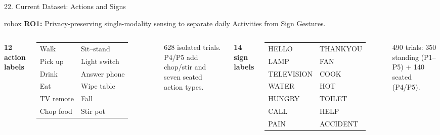 \documentclass[aspectratio=169,11pt,xcolor=table]{beamer}
\newcommand{\ROoneSent}{Privacy-preserving single-modality sensing to separate daily Activities from Sign Gestures.}
\newcommand{\robox}[1]{%
    \vspace{-0.12cm}%
    \begin{beamercolorbox}[
        wd=0.965\textwidth,
        sep=4pt,
        rounded=true
    ]{robox}
        \scriptsize #1
    \end{beamercolorbox}%
    \vspace{0.10cm}%
}
\newcommand{\roone}{\robox{\textbf{RO1:} \ROoneSent}}
\newcommand{\implnote}[1]{{\scriptsize\color{AmritaDark}#1\par}}
\begin{document}
\begin{frame}{22. Current Dataset: Actions and Signs}
\roone
\begin{columns}[T,onlytextwidth]
\raggedright
{\small\textbf{\color{AmritaMaroon}12 action labels}}\\[5pt]
\footnotesize
\renewcommand{\arraystretch}{1.16}
\begin{tabular}{@{}ll@{}}
Walk & Sit--stand\\
Pick up & Light switch\\
Drink & Answer phone\\
Eat & Wipe table\\
TV remote & Fall\\
Chop food & Stir pot
\end{tabular}
\vspace{0.14cm}

\implnote{628 isolated trials. P4/P5 add chop/stir and seven seated action types.}
\raggedright
{\small\textbf{\color{AmritaMaroon}14 sign labels}}\\[5pt]
\footnotesize
\renewcommand{\arraystretch}{1.16}
\begin{tabular}{@{}ll@{}}
HELLO & THANKYOU\\
LAMP & FAN\\
TELEVISION & COOK\\
WATER & HOT\\
HUNGRY & TOILET\\
CALL & HELP\\
PAIN & ACCIDENT
\end{tabular}
\vspace{0.12cm}

\implnote{490 trials: 350 standing (P1--P5) + 140 seated (P4/P5).}
\end{columns}
\end{frame}
\end{document}
